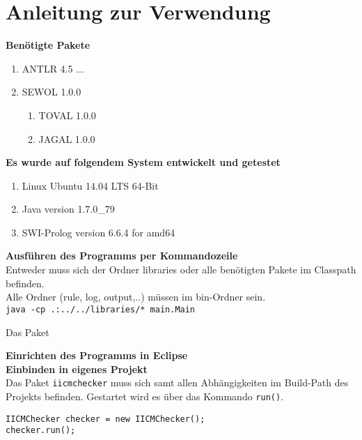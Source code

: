 
\chapter{Anleitung zur Verwendung} %

\label{UserManual} %


\textbf{Benötigte Pakete}
\begin{enumerate}
\item ANTLR 4.5 ...
\item SEWOL 1.0.0
\begin{enumerate}
\item TOVAL 1.0.0
\item JAGAL 1.0.0
\end{enumerate}
\end{enumerate}

\textbf{Es wurde auf folgendem System entwickelt und getestet}
\begin{enumerate}
\item Linux Ubuntu 14.04 LTS 64-Bit
\item Java version 1.7.0\_79
\item SWI-Prolog version 6.6.4 for amd64
\end{enumerate}

\textbf{Ausführen des Programms per Kommandozeile}\\
Entweder muss sich der Ordner libraries oder alle benötigten Pakete im Classpath befinden.\\
Alle Ordner (rule, log, output,..) müssen im bin-Ordner sein.\\

\texttt{java -cp .:../../libraries/* main.Main}



Das Paket \texttt{}

\textbf{Einrichten des Programms in Eclipse}\\


\textbf{Einbinden in eigenes Projekt}\\
Das Paket \texttt{iicmchecker} muss sich samt allen Abhängigkeiten im Build-Path des Projekts befinden. Gestartet wird es über das Kommando \texttt{run()}.\\
\begin{verbatim}
IICMChecker checker = new IICMChecker();
checker.run();
\end{verbatim}



